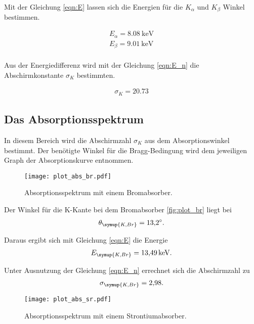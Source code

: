 Mit der Gleichung \eqref{eqn:E} lassen sich die Energien für die $K_\alpha$ und $K_\beta$
Winkel bestimmen.

\begin{align*}
  E_\alpha = \SI{8.08}{\kilo\eV}\\
  E_\beta = \SI{9.01}{\kilo\eV}\\
\end{align*}

Aus der Energiedifferenz wird mit der Gleichung \eqref{eqn:E_n} die Abschirmkonstante
$\sigma_K$ bestimmten.

\begin{align*}
  \sigma_K = \num{20.73}
\end{align*}

\subsection{Das Absorptionsspektrum}

In diesem Bereich wird die Abschirmzahl $\sigma_K$ aus dem Absorptionswinkel bestimmt.
Der benötigte Winkel für die Bragg-Bedingung wird dem jeweiligen Graph der Absorptionskurve
entnommen. \\

\begin{figure}[H]
  \centering
  \texttt{[image: plot\_abs\_br.pdf]}
  \caption{Absorptionsspektrum mit einem Bromabsorber.}
  \label{fig:plot_br}
\end{figure}

Der Winkel für die K-Kante bei dem Bromabsorber \eqref{fig:plot_br} liegt bei
\begin{align*}
  \theta_\symup{K,Br} = \SI{13.2}{\degree}.
\end{align*}

Daraus ergibt sich mit Gleichung \eqref{eqn:E} die Energie
\begin{align*}
  E_\symup{K,Br} = \SI{13.49}{\kilo\eV}.
\end{align*}

Unter Ausnutzung der Gleichung \eqref{eqn:E_n} errechnet sich die Abschirmzahl zu
\begin{align*}
  \sigma_\symup{K,Br} = \num{2.98} .
\end{align*}

\begin{figure}[H]
  \centering
  \texttt{[image: plot\_abs\_sr.pdf]}
  \caption{Absorptionsspektrum mit einem Strontiumabsorber.}
  \label{fig:plot_sr}
\end{figure}

